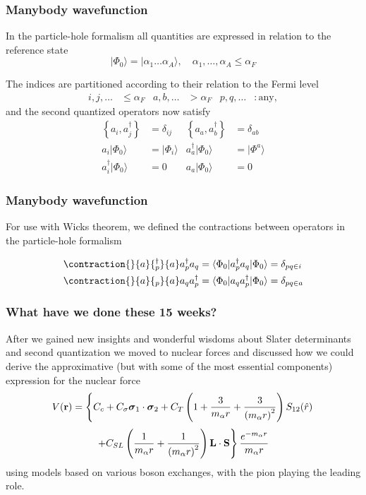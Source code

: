 \documentclass[compress]{beamer}
\newcommand*{\ket}[1]{|#1\rangle}
\newcommand*{\bra}[1]{\langle#1|}
\begin{document}
\begin{frame}[fragile]
    \frametitle{Manybody wavefunction}
    In the particle-hole formalism all quantities are expressed in relation to the reference state
    \begin{equation*}
        \ket{\Phi_0} = \ket{\alpha_1 \dots \alpha_A}, \quad \alpha_1, \dots, \alpha_A \leq \alpha_F
    \end{equation*}
        
    The indices are partitioned according to their relation to the Fermi level
    \begin{align*}
        i,j,\ldots &\leq \alpha_F & a,b,\ldots &> \alpha_F & p,q, \ldots &: \textrm{any},
    \end{align*}
    and the second quantized operators now satisfy
    \begin{align*}
        \left\{a_i, a_j^\dagger \right\} &= \delta_{ij} &  \left\{a_a, a_b^\dagger \right\} &= \delta_{ab} \\
        a_i\ket{\Phi_0} &= \ket{\Phi_i} & a_a^\dagger\ket{\Phi_0} &= \ket{\Phi^a} \\
        a_i^\dagger\ket{\Phi_0} &= 0 & a_a\ket{\Phi_0} &= 0
    \end{align*}
            
\end{frame}

\begin{frame}[fragile]
    \frametitle{Manybody wavefunction}

    For use with Wicks theorem, we defined the contractions between operators in the particle-hole formalism

    \begin{align*}
        \contraction{}{a}{ {}^\dagger_p}{a} a^\dagger_p a_q =
            \bra{\Phi_0} a^\dagger_p a_q \ket{\Phi_0} &=
            \delta_{pq\in i} \\
            \contraction{}{a}{ {}_p}{a} a_q a_p^\dagger =
            \bra{\Phi_0} a_q a^\dagger_p \ket{\Phi_0} &=
            \delta_{pq\in a} \\
    \end{align*}
            
\end{frame}

\frame
{
  \frametitle{What have we done these 15 weeks?}
After we gained new insights and wonderful wisdoms about Slater determinants and second quantization we moved to nuclear forces
and discussed how we could derive the approximative (but with some of the most essential components) expression for the nuclear force
\[
V({\bf r})= \left\{ C_c + C_\sigma 
\mbox{\boldmath $\sigma$}_1\cdot\mbox{\boldmath $\sigma$}_2
 + C_T \left( 1 + {3\over m_\alpha r} + {3\over
\left(m_\alpha r\right)^2}\right) S_{12} (\hat r)\right. 
\]
\[
\left. + C_{SL} \left( {1\over m_\alpha r} + {1\over \left( m_\alpha r\right)^2}
\right) {\bf L}\cdot {\bf S}
\right\} \frac{e^{-m_\alpha r}}{m_\alpha r}
\]
using models based on various boson exchanges, with the pion playing the leading role. 
}
\end{document}
